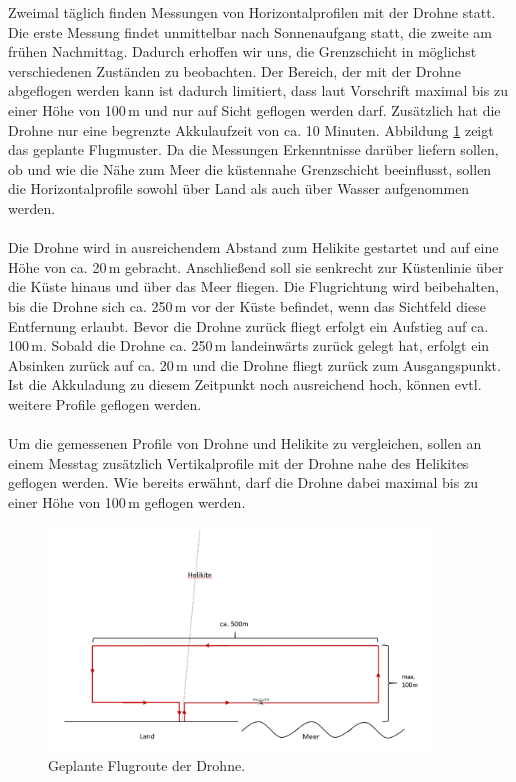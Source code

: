 \documentclass[a4paper,11pt,DIV=calc,tablecaptionabove,headinclude,twoside]{article}
\begin{document}
Zweimal täglich finden Messungen von Horizontalprofilen mit der Drohne statt. Die erste Messung findet unmittelbar nach Sonnenaufgang statt, die zweite am frühen Nachmittag. Dadurch erhoffen wir uns, die Grenzschicht in möglichst verschiedenen Zuständen zu beobachten. Der Bereich, der mit der Drohne abgeflogen werden kann ist dadurch limitiert, dass laut Vorschrift maximal bis zu einer Höhe von 100\,m und nur auf Sicht geflogen werden darf. Zusätzlich hat die Drohne nur eine begrenzte Akkulaufzeit von ca. 10 Minuten. Abbildung \ref{flugroute} zeigt das geplante Flugmuster. Da die Messungen Erkenntnisse darüber liefern sollen, ob und wie die Nähe zum Meer die küstennahe Grenzschicht beeinflusst, sollen die Horizontalprofile sowohl über Land als auch über Wasser aufgenommen werden. \\\\
Die Drohne wird in ausreichendem Abstand zum Helikite gestartet und auf eine Höhe von ca. 20\,m gebracht. Anschließend soll sie senkrecht zur Küstenlinie über die Küste hinaus und über das Meer fliegen. Die Flugrichtung wird beibehalten, bis die Drohne sich ca. 250\,m vor der Küste befindet, wenn das Sichtfeld diese Entfernung erlaubt. Bevor die Drohne zurück fliegt erfolgt ein Aufstieg auf ca. 100\,m. Sobald die Drohne ca. 250\,m landeinwärts zurück gelegt hat, erfolgt ein Absinken zurück auf ca. 20\,m und die Drohne fliegt zurück zum Ausgangspunkt. Ist die Akkuladung zu diesem Zeitpunkt noch ausreichend hoch, können evtl. weitere Profile geflogen werden. \\\\
Um die gemessenen Profile von Drohne und Helikite zu vergleichen, sollen an einem Messtag zusätzlich Vertikalprofile mit der Drohne nahe des Helikites geflogen werden. Wie bereits erwähnt, darf die Drohne dabei maximal bis zu einer Höhe von 100\,m geflogen werden. 

\begin{figure}[t]
\centering
\includegraphics[width=0.9\textwidth]{Flugroute.png}
\captionsetup{width=11cm}
\caption{Geplante Flugroute der Drohne.}
\label{flugroute}
\end{figure}
\end{document}
